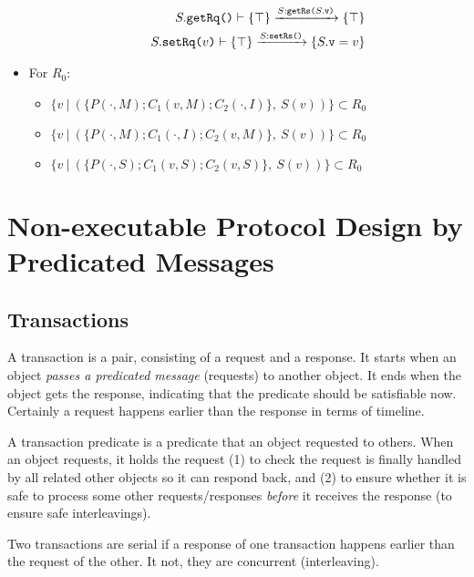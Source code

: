 \documentclass[format=manuscript]{acmart}
\begin{document}
\begin{itemize}
\begin{enumerate}
\begin{eqnarray}
      S.\texttt{getRq()}\vdash \{ \top \} \xrightarrow{S:\texttt{getRs(}S.\texttt{v}\texttt{)}} \{ \top \} \label{trs3} \\
      S.\texttt{setRq(}v\texttt{)}\vdash \{ \top \} \xrightarrow{S:\texttt{setRs()}} \{ S.\texttt{v} = v \} \label{trs4}
    \end{eqnarray}
  \end{enumerate}
\item For $R_0$:
  \begin{itemize}
  \item $\{ v\ |\ (\{ P(\cdot, M); C_1(v, M); C_2(\cdot, I) \},\ S(v)) \} \subset R_0$
  \item $\{ v\ |\ (\{ P(\cdot, M); C_1(\cdot, I); C_2(v, M) \},\ S(v)) \} \subset R_0$
  \item $\{ v\ |\ (\{ P(\cdot, S); C_1(v, S); C_2(v, S) \},\ S(v)) \} \subset R_0$
  \end{itemize}
\end{itemize}

\section{Non-executable Protocol Design by Predicated Messages}

\subsection{Transactions}

\begin{definition}[Transaction]
  A transaction is a pair, consisting of a request and a response. It starts
  when an object \emph{passes a predicated message} (requests) to another
  object. It ends when the object gets the response, indicating that the
  predicate should be satisfiable now. Certainly a request happens earlier than
  the response in terms of timeline.
\end{definition}

\begin{definition}
  A transaction predicate is a predicate that an object requested to
  others. When an object requests, it holds the request (1) to check the request
  is finally handled by all related other objects so it can respond back, and
  (2) to ensure whether it is safe to process some other requests/responses
  \emph{before} it receives the response (to ensure safe interleavings).
\end{definition}

\begin{definition}
  Two transactions are serial if a response of one transaction happens earlier
  than the request of the other. It not, they are concurrent (interleaving).
\end{definition}
\end{document}
